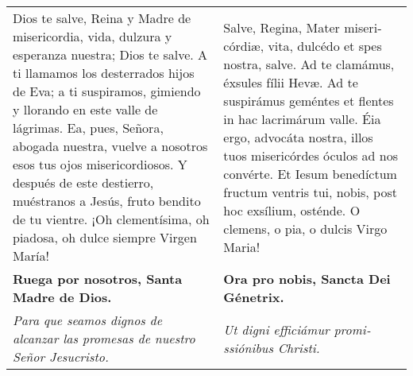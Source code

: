\documentclass[../devocionario.tex]{subfiles}
\begin{document}
    \begin{longtable} { p{} p{} }
        Dios te salve, Reina y Madre de mi­se­ri­cordia, vida, dulzura y esperanza nuestra; Dios te salve. 
        A ti llamamos los desterrados hijos de Eva; a ti suspiramos, gimiendo y llorando en este valle de lágrimas. 
        Ea, pues, Señora, abogada nuestra, vuelve a nosotros esos tus ojos mi­se­ri­cordiosos. Y después de este destierro, muéstranos a Jesús, 
        fruto bendito de tu vientre. ¡Oh cle­men­tísima, oh piadosa, oh dulce siempre Virgen María! &
        Salve, Regina, Mater mi­se­ri­córdiæ, vita, dulcédo et spes nostra, salve. Ad te clamámus, éxsules fílii Hevæ. 
        Ad te suspirámus geméntes et flentes in hac lacrimárum valle. Éia ergo, advocáta nostra, illos tuos mi­se­ri­córdes óculos ad nos convérte. 
        Et Iesum benedíctum fructum ventris tui, nobis, post hoc exsílium, osténde. O clemens, o pia, o dulcis Virgo Maria!\\
        
        \textbf{Ruega por nosotros, Santa Madre de Dios.} & \textbf{Ora pro nobis, Sancta Dei Génetrix.}\\
        
        \textit{Para que seamos dignos de alcanzar las promesas de nuestro Señor Jesucristo.} &
        \textit{Ut digni efficiámur pro­mi­ssiónibus Christi.}
    \end{longtable}
\end{document}
